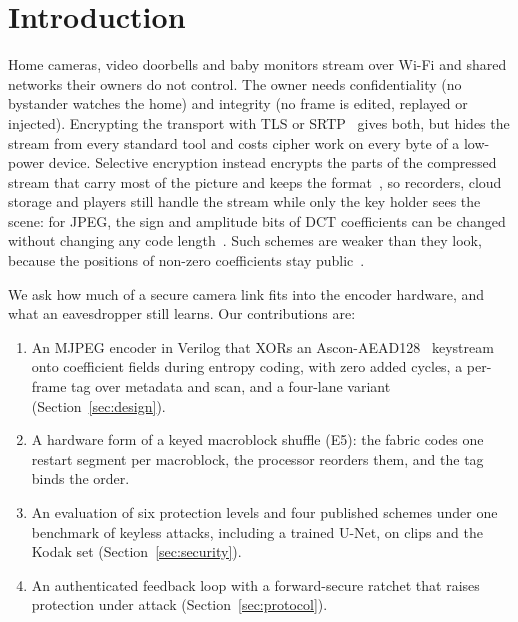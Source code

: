 \documentclass[conference]{IEEEtran}
\begin{document}
\section{Introduction}
Home cameras, video doorbells and baby monitors stream over Wi-Fi and shared networks their owners do not control. The owner needs confidentiality (no bystander watches the home) and integrity (no frame is edited, replayed or injected). Encrypting the transport with TLS or SRTP~\cite{rfc3711} gives both, but hides the stream from every standard tool and costs cipher work on every byte of a low-power device. Selective encryption instead encrypts the parts of the compressed stream that carry most of the picture and keeps the format~\cite{massoudi2008}, so recorders, cloud storage and players still handle the stream while only the key holder sees the scene: for JPEG, the sign and amplitude bits of DCT coefficients can be changed without changing any code length~\cite{vandroogenbroeck2002,auer2013}. Such schemes are weaker than they look, because the positions of non-zero coefficients stay public~\cite{massoudi2008,lin2024}.

We ask how much of a secure camera link fits into the encoder hardware, and what an eavesdropper still learns. Our contributions are:
\begin{enumerate}
\item An MJPEG encoder in Verilog that XORs an Ascon-AEAD128~\cite{sp800232} keystream onto coefficient fields during entropy coding, with zero added cycles, a per-frame tag over metadata and scan, and a four-lane variant (Section~\ref{sec:design}).
\item A hardware form of a keyed macroblock shuffle (E5): the fabric codes one restart segment per macroblock, the processor reorders them, and the tag binds the order.
\item An evaluation of six protection levels and four published schemes under one benchmark of keyless attacks, including a trained U-Net, on \NumVideoClips{} clips and the Kodak set (Section~\ref{sec:security}).
\item An authenticated feedback loop with a forward-secure ratchet that raises protection under attack (Section~\ref{sec:protocol}).
\end{enumerate}

\end{document}
